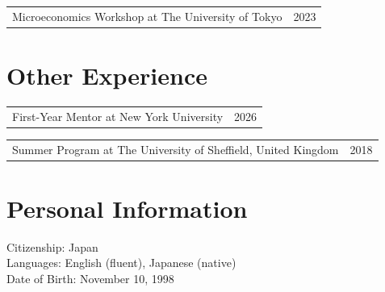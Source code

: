 \documentclass[11pt,letterpaper]{article}
\makeatletter
\newcommand{\cventry}[2]{%
  \begin{tabularx}{\textwidth}{@{}X r@{}}
    \begin{minipage}[t]{\linewidth}#1\end{minipage} & #2
  \end{tabularx}%
}
\makeatother
\begin{document}
\cventry{
  Microeconomics Workshop at The University of Tokyo
}{2023}


\section*{Other Experience}

\cventry{
  First-Year Mentor at New York University
}{2026}

\cventry{
  Summer Program at The University of Sheffield, United Kingdom
}{2018}

\section*{Personal Information}

Citizenship: Japan\\
Languages: English (fluent), Japanese (native)\\
Date of Birth: November 10, 1998
\end{document}
